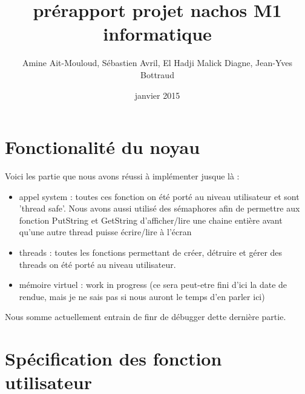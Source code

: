 \documentclass{report}
\begin{document}
\title {prérapport projet nachos \newline M1 informatique}
\author{Amine Ait-Mouloud, Sébastien Avril, El Hadji Malick Diagne, Jean-Yves Bottraud}
\date{janvier 2015}
\maketitle

\tableofcontents

\section{Fonctionalité du noyau}
	Voici les partie que nous avons réussi à implémenter jusque là :
	\begin{itemize}
		\item appel system : toutes ces fonction on été porté au niveau utilisateur et sont 'thread safe'. Nous avons aussi utilisé des sémaphores afin de permettre aux fonction PutString et GetString d'afficher/lire une chaine entière avant qu'une autre thread puisse écrire/lire à l'écran
		\item threads : toutes les fonctions permettant de créer, détruire et gérer des threads on été porté au niveau utilisateur.
		\item mémoire virtuel : work in progress (ce sera peut-etre fini d'ici la date de rendue, mais je ne sais pas si nous auront le temps d'en parler ici)
	\end{itemize}
	Nous somme actuellement entrain de finr de débugger dette dernière partie.

\section{Spécification des fonction utilisateur}
\end{document}
